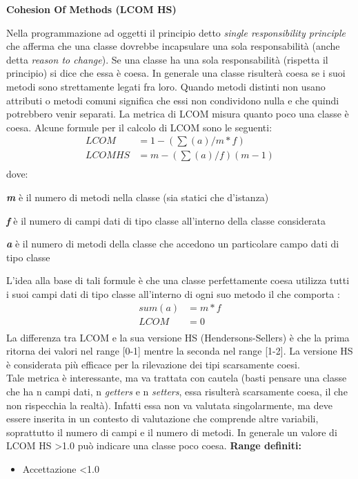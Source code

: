 {\large \textbf{Cohesion Of Methods (LCOM HS)}\par} 
Nella programmazione ad oggetti il principio detto \textit{single responsibility principle} che afferma che una classe dovrebbe incapsulare una sola responsabilità (anche detta \textit{reason to change}). Se una classe ha una sola responsabilità (rispetta il principio) si dice che essa è coesa. In generale una classe risulterà coesa se i suoi metodi sono strettamente legati fra loro. Quando metodi distinti non usano attributi o metodi comuni significa che essi non condividono nulla e che quindi potrebbero venir separati. La metrica di LCOM misura quanto poco una classe è coesa.
Alcune formule per il calcolo di LCOM sono le seguenti: \\
\begin{equation}
\begin{split}
LCOM& = 1-(\sum(a)/m*f) \\
LCOM HS& = m-(\sum(a)/f)(m-1) \\
\end{split}
\end{equation}
dove:
\begin{description}
	\item \textbf{\textit{m}} è il numero di metodi nella classe (sia statici che d'istanza)
	\item \textbf{\textit{f}} è il numero di campi dati di tipo classe all'interno della classe considerata
	\item \textbf{\textit{a}} è il numero di metodi della classe che accedono un particolare campo dati di tipo classe
\end{description}
L'idea alla base di tali formule è che una classe perfettamente coesa utilizza tutti i suoi campi dati di tipo classe all'interno di ogni suo metodo il che comporta :
\begin{equation}
\begin{split}
sum(a)& = m*f \\
LCOM& = 0\\
\end{split}
\end{equation}
La differenza tra LCOM e la sua versione HS (Hendersons-Sellers) è che la prima ritorna dei valori nel range [0-1] mentre la seconda nel range [1-2]. La versione HS è considerata più efficace per la rilevazione dei tipi scarsamente coesi. \\
Tale metrica è interessante, ma va trattata con cautela (basti pensare una classe che ha n campi dati, n \textit{getters} e n \textit{setters}, essa risulterà scarsamente coesa, il che non rispecchia la realtà). Infatti essa non va valutata singolarmente, ma deve essere inserita in un contesto di valutazione che comprende altre variabili, soprattutto il numero di campi e il numero di metodi. In generale un valore di LCOM HS \textgreater 1.0 può indicare una classe poco coesa.
\textbf{Range definiti:}
\begin{itemize}
	\item Accettazione \textless  1.0
\end{itemize}

